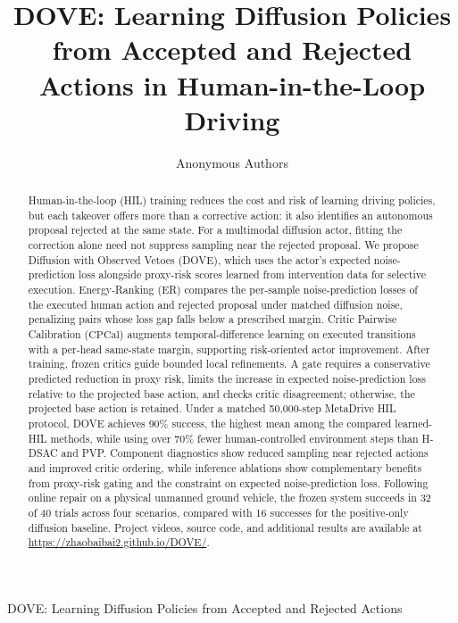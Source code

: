 \documentclass[9pt,journal]{IEEEtran}
\newcommand{\DOVE}{DOVE}
\newcommand{\CPCal}{\ensuremath{\mathrm{CPCal}}}
\begin{document}
\title{DOVE: Learning Diffusion Policies from Accepted and Rejected Actions in Human-in-the-Loop Driving}

\author{Anonymous Authors}

%
{DOVE: Learning Diffusion Policies from Accepted and Rejected Actions}

\maketitle


\begin{abstract}
Human-in-the-loop (HIL) training reduces the cost and risk of learning
driving policies, but each takeover offers more than a corrective action:
it also identifies an autonomous proposal rejected at the same state.
For a multimodal diffusion actor, fitting the correction alone need not
suppress sampling near the rejected proposal. We propose Diffusion with Observed Vetoes (\DOVE{}), which uses the
actor's expected noise-prediction loss alongside proxy-risk scores
learned from intervention data for selective execution.
Energy-Ranking (ER) compares the per-sample noise-prediction losses
of the executed human action and rejected proposal under matched
diffusion noise, penalizing pairs whose loss gap falls below a
prescribed margin. Critic Pairwise Calibration (\CPCal{}) augments
temporal-difference learning on executed transitions with a per-head
same-state margin, supporting risk-oriented actor improvement.
After training, frozen critics guide bounded local refinements.
A gate requires a conservative predicted reduction in proxy risk,
limits the increase in expected noise-prediction loss relative to
the projected base action, and checks critic disagreement; otherwise,
the projected base action is retained. Under a matched
50{,}000-step MetaDrive HIL protocol, \DOVE{} achieves 90\% success, the
highest mean among the compared learned-HIL methods, while using over
70\% fewer human-controlled environment steps than H-DSAC and PVP.
Component diagnostics show reduced sampling near rejected actions and
improved critic ordering, while inference ablations show complementary benefits from proxy-risk gating and the constraint on expected noise-prediction loss. Following online repair on a physical unmanned ground vehicle, the frozen system
succeeds in 32 of 40 trials across four scenarios, compared with 16
successes for the positive-only diffusion baseline.
Project videos, source code, and additional results are available at
\url{https://zhaobaibai2.github.io/DOVE/}.
\end{abstract}
\end{document}
